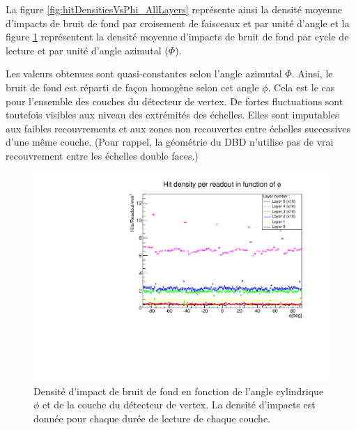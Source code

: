  \medskip
 
 La figure \ref{fig:hitDensitiesVsPhi_AllLayers} repr\'esente ainsi la densit\'e moyenne d'impacts de bruit de fond par croisement de faisceaux et par unit\'e d'angle et la figure \ref{fig:hitDensitiesVsPhireadout_AllLayers} repr\'esentent la densit\'e moyenne d'impacts de bruit de fond par cycle de lecture et par unit\'e d'angle azimutal ($\Phi$).
 
 \medskip
 
 Les valeurs obtenues sont quasi-constantes selon l'angle azimutal $\Phi$. Ainsi, le bruit de fond est r\'eparti de fa\c{c}on homog\`ene selon cet angle $\phi$. Cela est le cas pour l'ensemble des couches du d\'etecteur de vertex. De fortes fluctuations sont toutefois visibles aux niveau des extr\'emités des \'echelles. Elles sont imputables aux faibles recouvrements et aux zones non recouvertes entre  \'echelles successives d'une m\^eme couche. (Pour rappel, la g\'eom\'etrie du DBD n'utilise pas de vrai recouvrement entre les \'echelles double faces.)
    
  \begin{figure}[!htb]
    \begin{center}
     \includegraphics[scale=0.68]{./figures/Beamstrahlung/hitDensities_vs_phi_Per_Readout_AllLayers.pdf}
     \caption{Densit\'e d'impact de bruit de fond en fonction de l'angle cylindrique $\phi$ et de la couche du d\'etecteur de vertex. La densit\'e d'impacts est donn\'ee pour chaque dur\'ee de lecture de chaque couche.}
     \label{fig:hitDensitiesVsPhireadout_AllLayers}
    \end{center}
  \end{figure}
  
